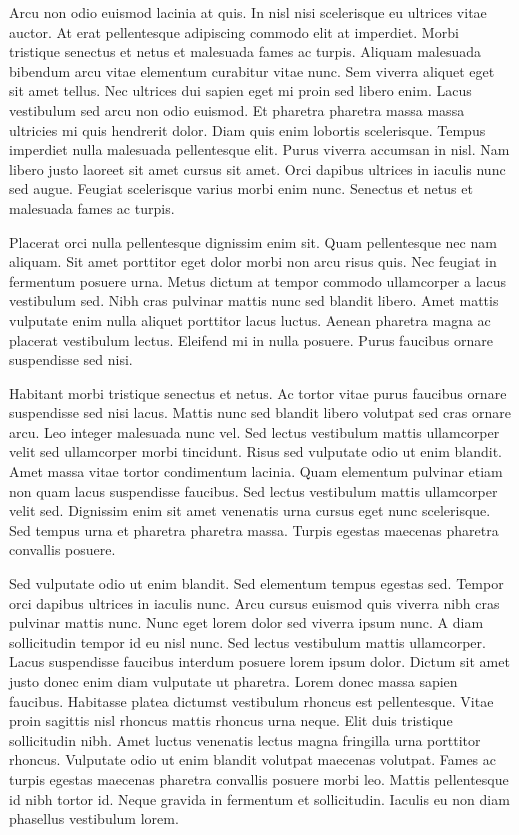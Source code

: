 \documentclass[conference]{IEEEtran}
\begin{document}
Arcu non odio euismod lacinia at quis. In nisl nisi scelerisque eu ultrices vitae auctor. At erat pellentesque adipiscing commodo elit at imperdiet. Morbi tristique senectus et netus et malesuada fames ac turpis. Aliquam malesuada bibendum arcu vitae elementum curabitur vitae nunc. Sem viverra aliquet eget sit amet tellus. Nec ultrices dui sapien eget mi proin sed libero enim. Lacus vestibulum sed arcu non odio euismod. Et pharetra pharetra massa massa ultricies mi quis hendrerit dolor. Diam quis enim lobortis scelerisque. Tempus imperdiet nulla malesuada pellentesque elit. Purus viverra accumsan in nisl. Nam libero justo laoreet sit amet cursus sit amet. Orci dapibus ultrices in iaculis nunc sed augue. Feugiat scelerisque varius morbi enim nunc. Senectus et netus et malesuada fames ac turpis.

Placerat orci nulla pellentesque dignissim enim sit. Quam pellentesque nec nam aliquam. Sit amet porttitor eget dolor morbi non arcu risus quis. Nec feugiat in fermentum posuere urna. Metus dictum at tempor commodo ullamcorper a lacus vestibulum sed. Nibh cras pulvinar mattis nunc sed blandit libero. Amet mattis vulputate enim nulla aliquet porttitor lacus luctus. Aenean pharetra magna ac placerat vestibulum lectus. Eleifend mi in nulla posuere. Purus faucibus ornare suspendisse sed nisi.

Habitant morbi tristique senectus et netus. Ac tortor vitae purus faucibus ornare suspendisse sed nisi lacus. Mattis nunc sed blandit libero volutpat sed cras ornare arcu. Leo integer malesuada nunc vel. Sed lectus vestibulum mattis ullamcorper velit sed ullamcorper morbi tincidunt. Risus sed vulputate odio ut enim blandit. Amet massa vitae tortor condimentum lacinia. Quam elementum pulvinar etiam non quam lacus suspendisse faucibus. Sed lectus vestibulum mattis ullamcorper velit sed. Dignissim enim sit amet venenatis urna cursus eget nunc scelerisque. Sed tempus urna et pharetra pharetra massa. Turpis egestas maecenas pharetra convallis posuere.

Sed vulputate odio ut enim blandit. Sed elementum tempus egestas sed. Tempor orci dapibus ultrices in iaculis nunc. Arcu cursus euismod quis viverra nibh cras pulvinar mattis nunc. Nunc eget lorem dolor sed viverra ipsum nunc. A diam sollicitudin tempor id eu nisl nunc. Sed lectus vestibulum mattis ullamcorper. Lacus suspendisse faucibus interdum posuere lorem ipsum dolor. Dictum sit amet justo donec enim diam vulputate ut pharetra. Lorem donec massa sapien faucibus. Habitasse platea dictumst vestibulum rhoncus est pellentesque. Vitae proin sagittis nisl rhoncus mattis rhoncus urna neque. Elit duis tristique sollicitudin nibh. Amet luctus venenatis lectus magna fringilla urna porttitor rhoncus. Vulputate odio ut enim blandit volutpat maecenas volutpat. Fames ac turpis egestas maecenas pharetra convallis posuere morbi leo. Mattis pellentesque id nibh tortor id. Neque gravida in fermentum et sollicitudin. Iaculis eu non diam phasellus vestibulum lorem.
\end{document}
